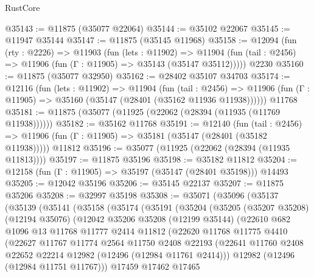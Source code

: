 \begin{lexlean}{RustCore}
\begin{coremodule}
@35143 := @11875 (@35077 @22064)
@35144 := @35102 @22067
@35145 := @11947 @35144
@35147 := @11875 (@35145 @11968)
@35158 := @12094
    (fun (rty : @2226) =>
    @11903
      (fun (lets : @11902) =>
      @11904 (fun (tail : @2456) => @11906 (fun (Γ : @11905) => @35143 (@35147 @35112)))))
    @2230
@35160 := @11875 (@35077 @32950)
@35162 := @28402 @35107 @34703
@35174 := @12116
    (fun (lets : @11902) =>
    @11904
      (fun (tail : @2456) =>
      @11906 (fun (Γ : @11905) => @35160 (@35147 (@28401 (@35162 @11936 @11938))))))
    @11768
@35181 := @11875 (@35077 (@11925 (@22062 (@28394 (@11935 (@11769 @11938))))))
@35182 := @35162 @11768
@35191 := @12140
    (fun (tail : @2456) => @11906 (fun (Γ : @11905) => @35181 (@35147 (@28401 (@35182 @11938)))))
    @11812
@35196 := @35077 (@11925 (@22062 (@28394 (@11935 @11813))))
@35197 := @11875 @35196
@35198 := @35182 @11812
@35204 := @12158 (fun (Γ : @11905) => @35197 (@35147 (@28401 @35198))) @14493
@35205 := @12042 @35196
@35206 := @35145 @22137
@35207 := @11875 @35206
@35208 := @32997 @35198
@35308 := @35071
    (@35096
      (@35137
        (@35139
          (@35141
            (@35158
              (@35174
                (@35191
                  (@35204
                    (@35205
                      (@35207 @35208)
                      (@12194 @35076)
                      (@12042
                        @35206
                        @35208
                        (@12199 @35144)
                        (@22610
                          @682
                          @1096
                          @13
                          @11768
                          @11777
                          @2414
                          @11812
                          (@22620
                            @11768
                            @11775
                            @4410
                            (@22627
                              @11767
                              @11774
                              @2564
                              @11750
                              @2408
                              @22193
                              (@22641
                                @11760
                                @2408
                                @22652
                                @22214
                                @12982
                                (@12496 (@12984 @11761 @2414)))
                              @12982
                              (@12496 (@12984 @11751 @11767)))
                            @17459
                            @17462
                            @17465

\end{coremodule}
\end{lexlean}
